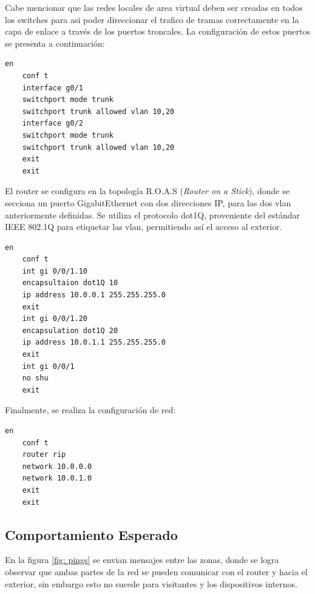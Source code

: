         Cabe mencionar que las redes locales de area virtual deben ser
        creadas en todos los switches para asi poder direccionar el 
        trafico de tramas correctamente en la capa de enlace a través
        de los puertos troncales. La configuración de estos puertos se 
        presenta a continuación:

        \begin{verbatim}
en
	conf t
	interface g0/1
	switchport mode trunk
	switchport trunk allowed vlan 10,20
	interface g0/2
	switchport mode trunk
	switchport trunk allowed vlan 10,20
	exit
	exit
        \end{verbatim}

        El router se configura en la topología R.O.A.S ({\it Router
        on a Stick}), donde se secciona un puerto GigabitEthernet
        con dos direcciones IP, para las dos vlan anteriormente
        definidas. Se utiliza el protocolo dot1Q, proveniente del
        estándar IEEE 802.1Q para etiquetar las vlan, permitiendo
        así el acceso al exterior.

        \begin{verbatim}
en
	conf t
	int gi 0/0/1.10
	encapsultaion dot1Q 10
	ip address 10.0.0.1 255.255.255.0
	exit
	int gi 0/0/1.20
	encapsulation dot1Q 20
	ip address 10.0.1.1 255.255.255.0
	exit
	int gi 0/0/1
	no shu
	exit
        \end{verbatim}

        Finalmente, se realiza la configuración de red:

        \begin{verbatim}
en
	conf t
	router rip
	network 10.0.0.0
	network 10.0.1.0
	exit
	exit
        \end{verbatim}

    \subsection{Comportamiento Esperado}

        En la figura \ref{fig: pings} se envian mensajes entre las zonas,
        donde se logra observar que ambas partes de la red se pueden
        comunicar con el router y hacia el exterior, sin embargo esto
        no sucede para visitantes y los dispositivos internos.
    
